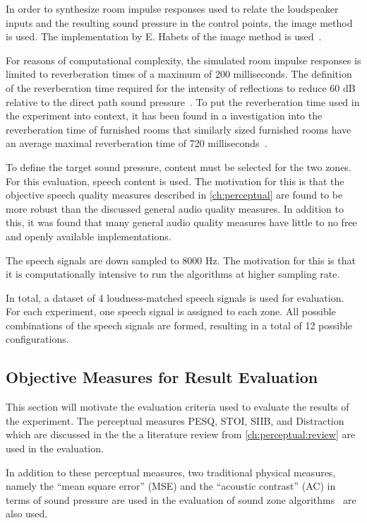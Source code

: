 In order to synthesize room impulse responses used to relate the loudspeaker inputs and the resulting sound pressure in the control points,
the image method~\cite{allen1979image} is used.
The implementation by E. Habets of the image method is used~\cite{habets2006room}.

For reasons of computational complexity, the simulated room impulse responses is limited to reverberation times of a maximum of 200
milliseconds.
The definition of the reverberation time required for the intensity of reflections to reduce 60 dB relative 
to the direct path sound pressure~\cite{habets2006room}. 
To put the reverberation time used in the experiment into context, it has been found in a investigation into the reverberation time of furnished rooms
that similarly sized furnished rooms have an average maximal reverberation time of 720 milliseconds~\cite{diaz2005reverberation}.

To define the target sound pressure, content must be selected for the two zones.
For this evaluation, speech content is used.
The motivation for this is that the objective speech quality measures described in \autoref{ch:perceptual} are found to be more robust than
the discussed general audio quality measures.
In addition to this, it was found that many general audio quality measures have 
little to no free and openly available implementations.

The speech signals are down sampled to 8000 Hz.
The motivation for this is that it is computationally intensive to run the algorithms at higher sampling rate.

In total, a dataset of 4 loudness-matched speech signals is used for evaluation.
For each experiment, one speech signal is assigned to each zone.
All possible combinations of the speech signals are formed, resulting in a total of 12 possible configurations.

\subsection{Objective Measures for Result Evaluation}
This section will motivate the evaluation criteria used to evaluate the results of the experiment.
The perceptual measures PESQ, STOI, SIIB, and Distraction which are discussed in 
the the a literature review from \autoref{ch:perceptual:review} are used in the evaluation.

In addition to these perceptual measures, two traditional physical measures, namely the ``mean square error'' (MSE) and
the ``acoustic contrast'' (AC) in terms of sound pressure are used in the evaluation of 
sound zone algorithms~\cite{lee2020unified} are also used.

